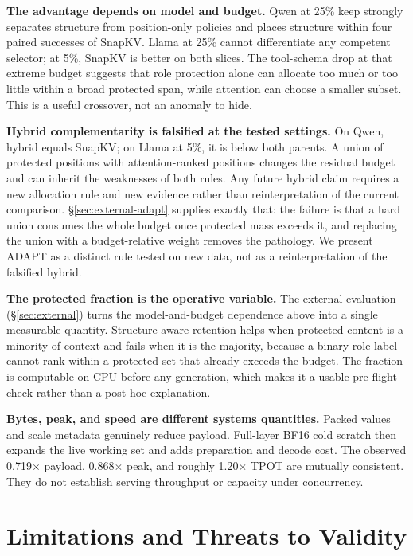 \documentclass[10pt]{article}
\begin{document}
\textbf{The advantage depends on model and budget.}
Qwen at 25\% keep strongly separates structure from position-only policies and
places structure within four paired successes of SnapKV.  Llama at 25\% cannot
differentiate any competent selector; at 5\%, SnapKV is better on both slices.
The tool-schema drop at that extreme budget suggests that role protection alone
can allocate too much or too little within a broad protected span, while
attention can choose a smaller subset.  This is a useful crossover, not an
anomaly to hide.

\textbf{Hybrid complementarity is falsified at the tested settings.}
On Qwen, hybrid equals SnapKV; on Llama at 5\%, it is below both parents.  A union
of protected positions with attention-ranked positions changes the residual
budget and can inherit the weaknesses of both rules.  Any future hybrid claim
requires a new allocation rule and new evidence rather than reinterpretation of
the current comparison.  \S\ref{sec:external-adapt} supplies exactly that: the
failure is that a hard union consumes the whole budget once protected mass
exceeds it, and replacing the union with a budget-relative weight removes the
pathology.  We present ADAPT as a distinct rule tested on new data, not as a
reinterpretation of the falsified hybrid.

\textbf{The protected fraction is the operative variable.}
The external evaluation (\S\ref{sec:external}) turns the model-and-budget
dependence above into a single measurable quantity.  Structure-aware retention
helps when protected content is a minority of context and fails when it is the
majority, because a binary role label cannot rank within a protected set that
already exceeds the budget.  The fraction is computable on CPU before any
generation, which makes it a usable pre-flight check rather than a post-hoc
explanation.

\textbf{Bytes, peak, and speed are different systems quantities.}
Packed values and scale metadata genuinely reduce payload.  Full-layer BF16
cold scratch then expands the live working set and adds preparation and decode
cost.  The observed 0.719$\times$ payload, 0.868$\times$ peak, and roughly
1.20$\times$ TPOT are mutually consistent.  They do not establish serving
throughput or capacity under concurrency.

\section{Limitations and Threats to Validity}
\label{sec:limitations}
\end{document}
